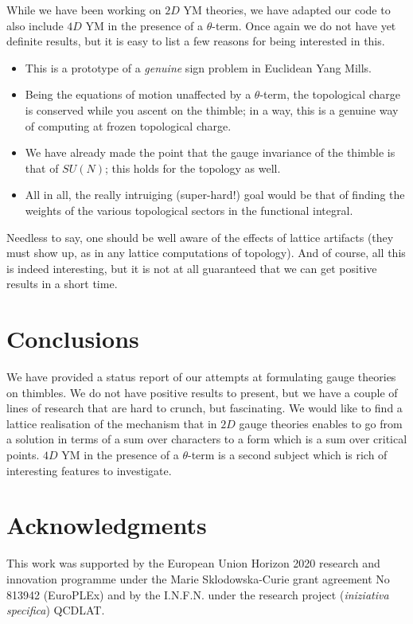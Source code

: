 \documentclass[a4paper,11pt]{article}
\begin{document}
While we have been working on $2D$ YM theories, we have adapted our
code to also include $4D$ YM in the presence of a $\theta$-term. Once
again we do not have yet definite results, but it is easy to list a
few reasons for being interested in this.
\begin{itemize}
\item This is a prototype of a {\em genuine} sign problem in Euclidean
  Yang Mills.
\item Being the equations of motion unaffected by a $\theta$-term, the
  topological charge is conserved while you ascent on the thimble; in
  a way, this is a genuine way of computing at frozen topological
  charge.
\item We have already made the point that the gauge invariance of the
  thimble is that of $SU(N)$; this holds for the
  topology as well.
\item All in all, the really intruiging (super-hard!) goal would be that of
  finding the weights of the various topological sectors in the
  functional integral.
\end{itemize}
Needless to say, one should be well aware of the effects of lattice
artifacts (they must show up, as in any lattice computations of
topology). And of course, all this is indeed interesting, but it is not at all
guaranteed that we can get positive results in a short time.

\section{Conclusions}
We have provided a status report of our attempts at formulating gauge
theories on thimbles. We do not have positive results to present, but
we have a couple of lines of research that are hard to crunch, but
fascinating. We would like to find a lattice realisation of the
mechanism that in $2D$ gauge theories enables to go from a solution 
in terms of a sum over characters to a form which is a sum over
critical points. $4D$ YM in the presence of a $\theta$-term is a
second subject which is rich of interesting features to investigate.

\section{Acknowledgments}
This work was supported by the European Union Horizon 2020 research and innovation
programme under the Marie Sklodowska-Curie grant agreement No 813942 (EuroPLEx) 
and by the I.N.F.N. under the research project ({\em iniziativa specifica}) QCDLAT.
\end{document}
